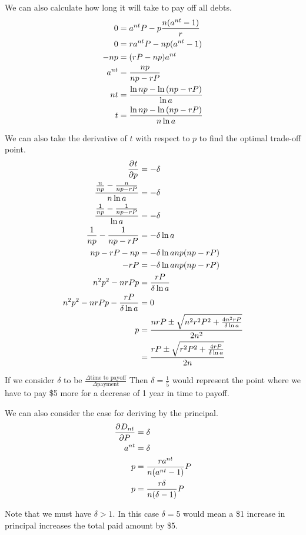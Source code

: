 \documentclass[12pt]{article}
\begin{document}
We can also calculate how long it will take to pay off all debts.
\begin{align*}
    0 &= a^{nt} P - p \frac{n (a^{nt} - 1)}{r}\\
    0 &= ra^{nt} P - np (a^{nt} - 1)\\
    -np &= (rP - np) a^{nt}\\
    a^{nt} &= \frac{np}{np - rP}\\
    nt &= \frac{\ln{np} - \ln\del{np - rP}}{\ln{a}}\\
    t &= \frac{\ln{np} - \ln\del{np - rP}}{n\ln{a}}
\end{align*}

We can also take the derivative of $t$ with respect to $p$ to find the optimal
trade-off point.
\begin{align*}
    \dpd{t}{p} &= -\delta\\
    \frac{\frac{n}{np} - \frac{n}{np - rP}}{n \ln{a}} &= -\delta\\
    \frac{\frac{1}{np} - \frac{1}{np - rP}}{\ln{a}} &= -\delta\\
    \frac{1}{np} - \frac{1}{np - rP} &= -\delta \ln{a}\\
    np - rP - np &= -\delta \ln{a} np (np - rP)\\
    -rP &= -\delta \ln{a} np (np - rP)\\
    n^2 p^2 - nrP p &= \frac{rP}{\delta \ln{a}}\\
    n^2 p^2 - nrP p - \frac{rP}{\delta \ln{a}} &= 0\\
    p &= \frac{nrP \pm \sqrt{n^2r^2P^2 + \frac{4n^2 rP}{\delta \ln{a}}}}{2n^2}\\
      &= \frac{rP \pm \sqrt{r^2P^2 + \frac{4rP}{\delta \ln{a}}}}{2n}
\end{align*}

If we consider $\delta$ to be
$\frac{\Delta\text{time to payoff}}{\Delta\text{payment}}$
Then $\delta = \frac{1}{5}$ would represent the point where we have to pay \$5
more for a decrease of 1 year in time to payoff.

We can also consider the case for deriving by the principal.
\begin{align*}
    \dpd{D_{nt}}{P} &= \delta\\
    a^{nt} &= \delta\\
    p &= \frac{r a^{nt}}{n (a^{nt} - 1)} P\\
    p &= \frac{r \delta}{n (\delta - 1)} P
\end{align*}

Note that we must have $\delta > 1$.
In this case $\delta = 5$ would mean a \$1 increase in principal increases the
total paid amount by \$5.
\end{document}

